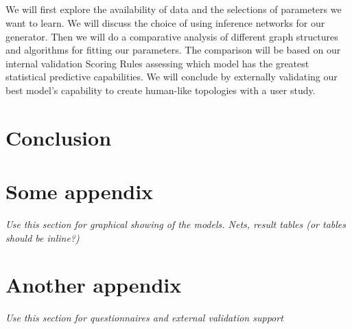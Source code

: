 \documentclass{UoYCSproject}
\begin{document}
\paragraph{}
We will first explore the availability of data and the selections of parameters we want to learn. We will discuss the choice of using inference networks for our generator. Then we will do a comparative analysis of different graph structures and algorithms for fitting our parameters. The comparison will be based on our internal validation Scoring Rules \parencite{PearlScoringRules} assessing which model has the greatest statistical predictive capabilities. We will conclude by externally validating our best model’s capability to create human-like topologies with a user study.




\chapter{Conclusion}
\label{cha:conclusion}


\appendix
\chapter{Some appendix}
\textit{Use this section for graphical showing of the models. Nets, result tables (or tables should be inline?)}

\chapter{Another appendix}
\textit{Use this section for questionnaires and external validation support}

\printbibliography
\end{document}
